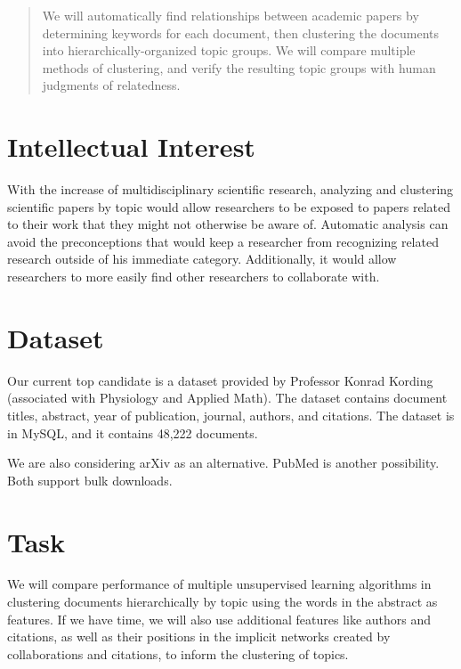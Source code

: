 \documentclass{acm_proc_article-sp}
\begin{document}
\date{16 November 2012}

\maketitle
\begin{abstract}
	We will automatically find relationships between academic papers by determining keywords for each document, then clustering the documents into hierarchically-organized topic groups. We will compare multiple methods of clustering, and verify the resulting topic groups with human judgments of relatedness.
\end{abstract}


\section{Intellectual Interest}
With the increase of  multidisciplinary scientific research, analyzing and clustering scientific papers by topic would allow researchers to be exposed to papers related to their work that they might not otherwise be aware of. Automatic analysis can avoid the preconceptions that would keep a researcher from recognizing related research outside of his immediate category. Additionally, it would allow researchers to more easily find other researchers to collaborate with.

\section{Dataset}
Our current top candidate is a dataset provided by Professor Konrad Kording (associated with Physiology and Applied Math). The dataset contains document titles, abstract, year of publication, journal, authors, and citations. The dataset is in MySQL, and it contains 48,222 documents.

We are also considering arXiv as an alternative. PubMed is another possibility. Both support bulk downloads.

\section{Task}
We will compare performance of multiple unsupervised learning algorithms in clustering documents hierarchically by topic using the words in the abstract as features. If we have time, we will also use additional features like authors and citations, as well as their positions in the implicit networks created by collaborations and citations, to inform the clustering of topics. 
\end{document}
